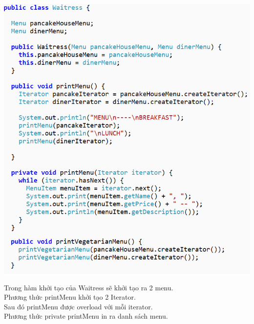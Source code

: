 \begin{center}
	\includegraphics[width=1\columnwidth,height=0.7\textheight]{GALLEYS/images/chapter3/images10}\\
\end{center}
 Trong hàm khởi tạo của Waitress sẽ khởi tạo ra 2 menu.\\
Phương thức printMenu khởi tạo 2 Iterator.\\
Sau đó printMenu được overload với mỗi iterator.\\
Phương thức private printMenu in ra danh sách menu.\\
